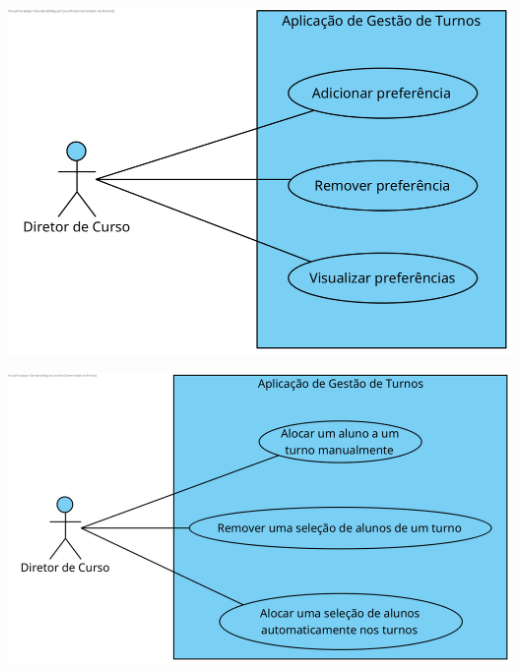 \documentclass[a4paper,12pt]{scrreprt}
\begin{document}
\begin{minipage}{\textwidth}
    \centering
    \includegraphics[width=1\textwidth]{images/use-cases-diagrams/3-gestao-preferencias.png}
    \label{fig:2-3-diagrama_de_casos_de_uso_gestao_de_preferencias}
\end{minipage}

\vspace{1cm}

\begin{minipage}{\textwidth}
    \centering
    \includegraphics[width=1\textwidth]{images/use-cases-diagrams/4-alocacao-alunos.png}
    \label{fig:2-4-diagrama_de_casos_de_uso_alocacao_de_alunos}
\end{minipage}

\end{document}
